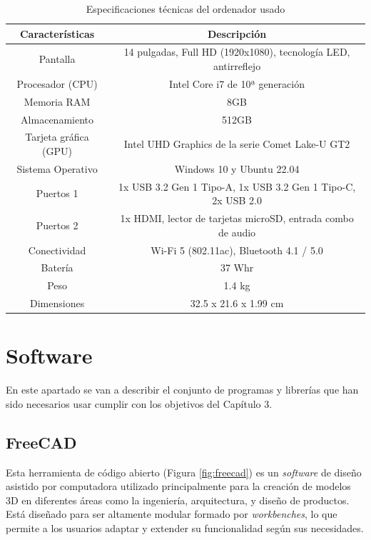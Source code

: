 \setcounter{footnote}{43} %

\begin{table}[H]
	\begin{center}
		\begin{tabular}{|c|c|}
			\hline
			\textbf{Características} & \textbf{Descripción} \\
			\hline
			Pantalla & 14 pulgadas, Full HD (1920x1080), tecnología LED, antirreflejo \\
			Procesador (CPU) & Intel Core i7 de 10ª generación \\
			Memoria RAM & 8GB \\
			Almacenamiento & 512GB \\
			Tarjeta gráfica (GPU) & Intel UHD Graphics de la serie Comet Lake-U GT2 \\
			Sistema Operativo & Windows 10 y Ubuntu 22.04 \\
			Puertos 1 & 1x USB 3.2 Gen 1 Tipo-A, 1x USB 3.2 Gen 1 Tipo-C, 2x USB 2.0\\  
			Puertos 2 & 1x HDMI, lector de tarjetas microSD, entrada combo de audio \\
			Conectividad & 	Wi-Fi 5 (802.11ac), Bluetooth 4.1 / 5.0 \\
			Batería & 37 Whr \\
			Peso & 1.4 kg \\
			Dimensiones & 32.5 x 21.6 x 1.99 cm \\
			\hline
		\end{tabular}
		\caption{Especificaciones técnicas del ordenador usado}
		\label{cuadro:carac_ordena}
	\end{center}
\end{table}


\section{Software}

En este apartado se van a describir el conjunto de programas y librerías que han sido necesarios usar cumplir con los objetivos del Capítulo 3.

\subsection{FreeCAD}

Esta herramienta de código abierto (Figura \ref{fig:freecad}) es un \textit{software} de diseño asistido por computadora utilizado principalmente para la creación de modelos 3D en diferentes áreas como la ingeniería, arquitectura, y diseño de productos. Está diseñado para ser altamente modular formado por \textit{workbenches}, lo que permite a los usuarios adaptar y extender su funcionalidad según sus necesidades.

